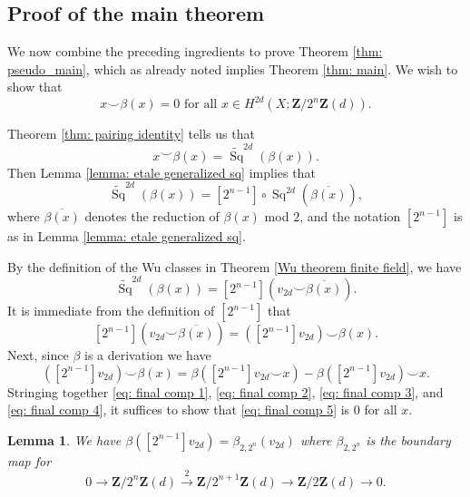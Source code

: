 \documentclass[10pt, reqno]{amsart}
\numberwithin{equation}{subsection}
\newcommand{\wt}[1]{\widetilde{#1}}
\newcommand{\Z}{\mathbf{Z}}
\newcommand{\ol}[1]{\overline{#1}}
\DeclareMathOperator{\et}{\acute{e}t}
\DeclareMathOperator{\Sq}{Sq}
\newtheorem{lemma}[thm]{Lemma}
\theoremstyle{remark}
\begin{document}
\subsection{Proof of the main theorem}\label{subsec: proof main theorem}

We now combine the preceding ingredients to prove Theorem \ref{thm: pseudo_main}, which as already noted implies Theorem \ref{thm: main}. We wish to show that 
\[
x \smile \beta (x)  = 0  \text{ for all } x \in H^{2d}_{\et}(X;\Z/2^n\Z(d)).
\]

Theorem \ref{thm: pairing identity} tells us that
\begin{equation}\label{eq: final comp 1}
x \smile \beta (x) = \wt{\Sq}^{2d}( \beta(x)).
\end{equation}
Then Lemma \ref{lemma: etale generalized sq} implies that
\begin{equation}\label{eq: final comp 2}
\wt{\Sq}^{2d} (\beta (x)) = [2^{n-1}] \circ \Sq^{2d} (\ol{\beta (x)}),
\end{equation}
where $\ol{\beta (x)}$ denotes the reduction of $\beta(x)$ mod $2$, and the notation $[2^{n-1}]$ is as in Lemma \ref{lemma: etale generalized sq}.

By the definition of the Wu classes in Theorem \ref{Wu theorem finite field}, we have
\begin{equation}\label{eq: final comp 3}
\wt{\Sq}^{2d} (\beta (x)) = [2^{n-1}] ( v_{2d} \smile \ol{\beta (x)} ).
\end{equation}
It is immediate from the definition of $[2^{n-1}]$ that 
\begin{equation}\label{eq: final comp 4}
[2^{n-1}] (v_{2d} \smile \ol{\beta(x)}) = ([2^{n-1}] v_{2d}) \smile \beta(x).
\end{equation}
Next, since $\beta$ is a derivation we have 
\begin{equation}\label{eq: final comp 5}
 ([2^{n-1}] v_{2d})  \smile \beta(x)   = \beta([2^{n-1}] v_{2d} \smile x )  - \beta([2^{n-1}] v_{2d} ) \smile x.
\end{equation}
Stringing together \eqref{eq: final comp 1}, \eqref{eq: final comp 2}, \eqref{eq: final comp 3}, and \eqref{eq: final comp 4}, it suffices to show that \eqref{eq: final comp 5} is $0$ for all $x$. 

\begin{lemma}\label{lem: two obstructions}
We have $\beta([2^{n-1}] v_{2d} ) =  \beta_{2,2^n}(v_{2d})$ where $\beta_{2,2^n}$ is the boundary map for 
\[
0 \rightarrow \Z/2^n \Z(d) \xrightarrow{2}  \Z/2^{n+1} \Z(d)  \rightarrow \Z/2 \Z (d) \rightarrow 0.
\]
\end{lemma}
\end{document}
